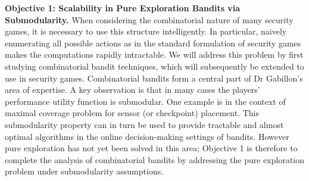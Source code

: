 \textbf{Objective 1: Scalability in Pure Exploration Bandits via Submodularity.}
When considering the combinatorial nature of many security games, it is necessary to use this structure intelligently.  In particular, naively enumerating all possible actions as in the standard formulation of security games makes the computations rapidly intractable.  
We will address this problem by first studying combinatorial bandit techniques, which will subsequently be extended to use in security games.  Combinatorial bandits form a central part of Dr Gabillon's area of expertise.   A key observation is that in many cases the players' performance utility function is submodular. One example is in the context of maximal coverage problem for sensor (or checkpoint) placement\cite{krause2011randomized}. 
 This submodularity property can in turn be used to provide tractable and almost optimal algorithms in the online decision-making settings of bandits\cite{gabillon2013adaptive}.  However pure exploration has not yet been solved in this area; Objective 1 is therefore to complete the analysis of combinatorial bandits by addressing the pure exploration problem under submodularity assumptions.
% 
 
 
